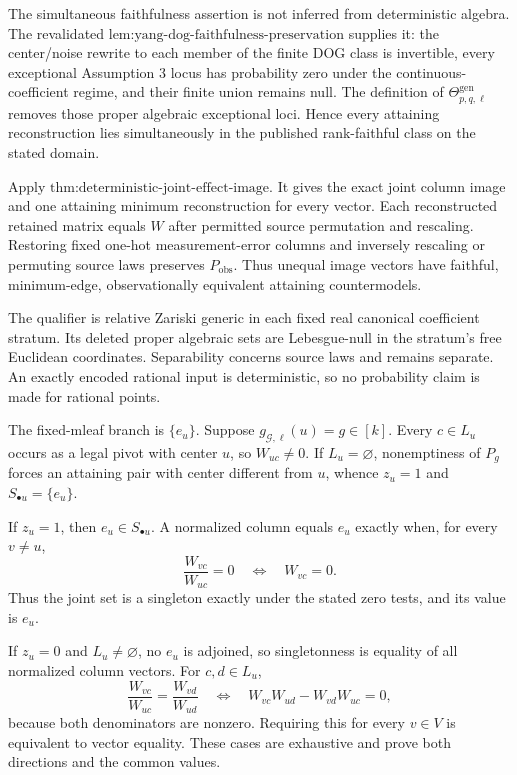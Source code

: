 The simultaneous faithfulness assertion is not inferred from deterministic algebra. The revalidated \(\text{lem:yang-dog-faithfulness-preservation}\) supplies it: the center/noise rewrite to each member of the finite DOG class is invertible, every exceptional Assumption 3 locus has probability zero under the continuous-coefficient regime, and their finite union remains null. The definition of \(\Theta_{p,q,\ell}^{\mathrm{gen}}\) removes those proper algebraic exceptional loci. Hence every attaining reconstruction lies simultaneously in the published rank-faithful class on the stated domain.

Apply \(\text{thm:deterministic-joint-effect-image}\). It gives the exact joint column image and one attaining minimum reconstruction for every vector. Each reconstructed retained matrix equals \(W\) after permitted source permutation and rescaling. Restoring fixed one-hot measurement-error columns and inversely rescaling or permuting source laws preserves \(P_{\mathrm{obs}}\). Thus unequal image vectors have faithful, minimum-edge, observationally equivalent attaining countermodels.

The qualifier is relative Zariski generic in each fixed real canonical coefficient stratum. Its deleted proper algebraic sets are Lebesgue-null in the stratum's free Euclidean coordinates. Separability concerns source laws and remains separate. An exactly encoded rational input is deterministic, so no probability claim is made for rational points.

The fixed-mleaf branch is \(\{e_u\}\). Suppose \(g_{\mathcal G,\ell}(u)=g\in[k]\). Every \(c\in L_u\) occurs as a legal pivot with center \(u\), so \(W_{uc}\ne0\). If \(L_u=\varnothing\), nonemptiness of \(P_g\) forces an attaining pair with center different from \(u\), whence \(z_u=1\) and \(S_{\bullet u}=\{e_u\}\).

If \(z_u=1\), then \(e_u\in S_{\bullet u}\). A normalized column equals \(e_u\) exactly when, for every \(v\ne u\),
\[
\frac{W_{vc}}{W_{uc}}=0\quad\Longleftrightarrow\quad W_{vc}=0.
\]
Thus the joint set is a singleton exactly under the stated zero tests, and its value is \(e_u\).

If \(z_u=0\) and \(L_u\ne\varnothing\), no \(e_u\) is adjoined, so singletonness is equality of all normalized column vectors. For \(c,d\in L_u\),
\[
\frac{W_{vc}}{W_{uc}}=\frac{W_{vd}}{W_{ud}}
\quad\Longleftrightarrow\quad
W_{vc}W_{ud}-W_{vd}W_{uc}=0,
\]
because both denominators are nonzero. Requiring this for every \(v\in V\) is equivalent to vector equality. These cases are exhaustive and prove both directions and the common values.

